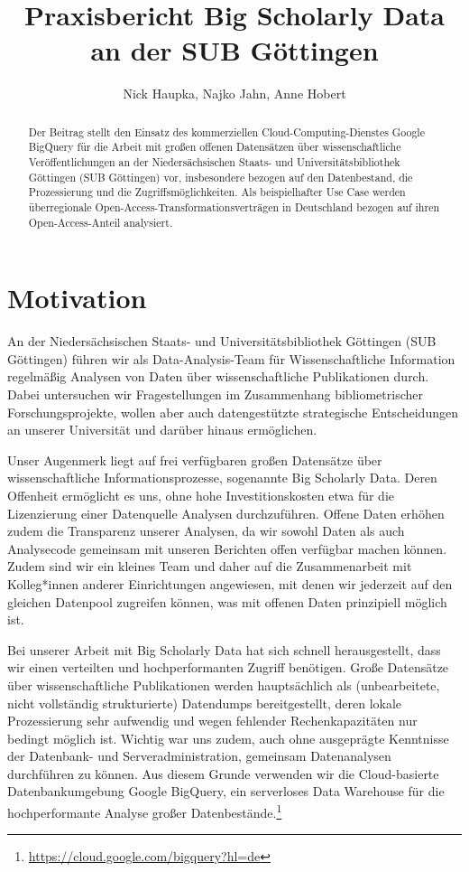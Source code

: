 \documentclass[a4paper,
fontsize=11pt,
oneside,
numbers=noperiodatend,
parskip=half-,
bibliography=totoc,
final
]{scrartcl}
\title{\LARGE{Praxisbericht Big Scholarly Data an der SUB Göttingen}}%
\author{Nick Haupka, Najko Jahn, Anne Hobert} %
\date{}
\begin{document}
\maketitle
\thispagestyle{fancyplain} 

\begin{abstract}
\noindent
Der Beitrag stellt den Einsatz des kommerziellen
Cloud-Computing-Dienstes Google BigQuery für die Arbeit mit großen
offenen Datensätzen über wissenschaftliche Veröffentlichungen an der
Niedersächsischen Staats- und Universitätsbibliothek Göttingen (SUB
Göttingen) vor, insbesondere bezogen auf den Datenbestand, die
Prozessierung und die Zugriffsmöglichkeiten. Als beispielhafter Use Case
werden überregionale Open-Access-Transformationsverträgen in Deutschland
bezogen auf ihren Open-Access-Anteil analysiert.
\end{abstract}

\hypertarget{motivation}{%
\section{Motivation}\label{motivation}}

An der Niedersächsischen Staats- und Universitätsbibliothek Göttingen
(SUB Göttingen) führen wir als Data-Analysis-Team für Wissenschaftliche
Information regelmäßig Analysen von Daten über wissenschaftliche
Publikationen durch. Dabei untersuchen wir Fragestellungen im
Zusammenhang bibliometrischer Forschungsprojekte, wollen aber auch
datengestützte strategische Entscheidungen an unserer Universität und
darüber hinaus ermöglichen.

Unser Augenmerk liegt auf frei verfügbaren großen Datensätze über
wissenschaftliche Informationsprozesse, sogenannte Big Scholarly Data.
Deren Offenheit ermöglicht es uns, ohne hohe Investitionskosten etwa für
die Lizenzierung einer Datenquelle Analysen durchzuführen. Offene Daten
erhöhen zudem die Transparenz unserer Analysen, da wir sowohl Daten als
auch Analysecode gemeinsam mit unseren Berichten offen verfügbar machen
können. Zudem sind wir ein kleines Team und daher auf die Zusammenarbeit
mit Kolleg*innen anderer Einrichtungen angewiesen, mit denen wir
jederzeit auf den gleichen Datenpool zugreifen können, was mit offenen
Daten prinzipiell möglich ist.

Bei unserer Arbeit mit Big Scholarly Data hat sich schnell
herausgestellt, dass wir einen verteilten und hochperformanten Zugriff
benötigen. Große Datensätze über wissenschaftliche Publikationen werden
hauptsächlich als (unbearbeitete, nicht vollständig strukturierte)
Datendumps bereitgestellt, deren lokale Prozessierung sehr aufwendig und
wegen fehlender Rechenkapazitäten nur bedingt möglich ist. Wichtig war
uns zudem, auch ohne ausgeprägte Kenntnisse der Datenbank- und
Serveradministration, gemeinsam Datenanalysen durchführen zu können. Aus
diesem Grunde verwenden wir die Cloud-basierte Datenbankumgebung Google
BigQuery, ein serverloses Data Warehouse für die hochperformante Analyse
großer Datenbestände.\footnote{\url{https://cloud.google.com/bigquery?hl=de}}
\end{document}
